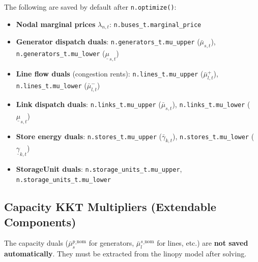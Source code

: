 \documentclass{article}
\begin{document}
The following are saved by default after \texttt{n.optimize()}:

\begin{itemize}
    \item \textbf{Nodal marginal prices} $\lambda_{n,t}$:
          \texttt{n.buses\_t.marginal\_price} 
    \item \textbf{Generator dispatch duals}:
          \texttt{n.generators\_t.mu\_upper} ($\bar{\mu}_{s,t}$),
          \texttt{n.generators\_t.mu\_lower} ($\underline{\mu}_{s,t}$)
    \item \textbf{Line flow duals} (congestion rents):
          \texttt{n.lines\_t.mu\_upper} ($\bar{\mu}^+_{l,t}$),
          \texttt{n.lines\_t.mu\_lower} ($\bar{\mu}^-_{l,t}$)
    \item \textbf{Link dispatch duals}:
          \texttt{n.links\_t.mu\_upper} ($\bar{\mu}_{s,t}$),
          \texttt{n.links\_t.mu\_lower} ($\underline{\mu}_{s,t}$)
    \item \textbf{Store energy duals}:
          \texttt{n.stores\_t.mu\_upper} ($\bar{\gamma}_{k,t}$),
          \texttt{n.stores\_t.mu\_lower} ($\underline{\gamma}_{k,t}$)
    \item \textbf{StorageUnit duals}:
          \texttt{n.storage\_units\_t.mu\_upper},
          \texttt{n.storage\_units\_t.mu\_lower}
\end{itemize}

\subsection{Capacity KKT Multipliers (Extendable Components)}

The capacity duals ($\bar{\mu}^{p\_\text{nom}}_{s}$ for generators,
$\bar{\mu}^{s\_\text{nom}}_{l}$ for lines, etc.) are \textbf{not saved
automatically}. They must be extracted from the linopy model after solving.
\end{document}
